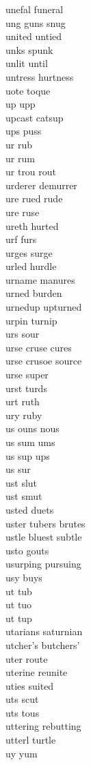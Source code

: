 unefal funeral \\
ung guns snug \\
united untied\\
unks spunk \\
unlit until\\
untress hurtness \\
uote toque \\
up upp \\
upcast catsup\\
ups puss \\
ur rub \\
ur rum \\
ur trou rout  \\
urderer demurrer \\
ure rued rude \\
ure ruse \\
ureth hurted \\
urf furs \\
urges surge\\
urled hurdle \\
urname manures \\
urned burden \\
urnedup upturned \\
urpin turnip \\
urs sour \\
urse cruse cures \\
urse crusoe source  \\
urse super \\
urst turds \\
urt ruth \\
ury ruby \\
us ouns nous  \\
us sum ums \\
us sup ups \\
us sur \\
ust slut \\
ust smut \\
usted duets\\
uster tubers brutes \\
ustle bluest subtle \\
usto gouts \\
usurping pursuing\\
usy buys \\
ut tub \\
ut tuo \\
ut tup \\
utarians saturnian \\
utcher's butchers' \\
uter route \\
uterine reunite\\
uties suited \\
uts scut \\
uts tous \\
uttering rebutting \\
utterl turtle\\
uy yum \\

